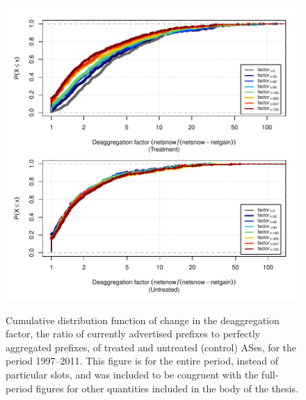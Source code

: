 \begin{figure}[H]
\begin{centering}
\begin{singlespace}
    \includegraphics[width=6in]{figures/behavior-deagg_factor-1997_2011-corr.pdf}
    \vspace{-2em}\\
    \caption{Cumulative distribution function of change in the deaggregation
    factor, the ratio of currently advertised prefixes to perfectly aggregated
    prefixes, of treated and untreated (control) ASes, for the period
    1997--2011. This figure is for the entire period, instead of particular
    slots, and was included to be congruent with the full-period figures for
    other quantities included in the body of the thesis.}
\end{singlespace}
\end{centering}
\end{figure}

